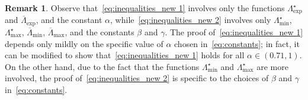 \documentclass[11pt]{article}
\numberwithin{equation}{section}
\theoremstyle{definition}
\newtheorem{remark}[theorem]{Remark}
\begin{document}
\begin{remark}
Observe that~\eqref{eq:inequalities_new 1} involves only the functions $\Lambda_{\exp}^{\star}$ and $\overline{\Lambda}_{\exp}$, and the constant $\alpha$, 
while~\eqref{eq:inequalities_new 2} involves only 
$\Lambda_{\min}^{\star}$, 
$\Lambda_{\max}^{\star}$, 
$\overline{\Lambda}_{\min}$, 
$\overline{\Lambda}_{\max}$, 
and the constants $\beta$ and $\gamma$. 
The proof of~\eqref{eq:inequalities_new 1} 
depends only mildly on the specific value of $\alpha$ chosen in~\eqref{eq:constants}; 
in fact, it can be modified to show  that~\eqref{eq:inequalities_new 1} holds for all $\alpha \in (0.71,1)$. 
On the other hand, due to the fact that the functions 
$\Lambda_{\min}^{\star}$ and 
$\Lambda_{\max}^{\star}$ 
are more involved, 
the proof of~\eqref{eq:inequalities_new 2} is specific to the choices of $\beta$ and $\gamma$ in~\eqref{eq:constants}. 
\end{remark}
\end{document}
